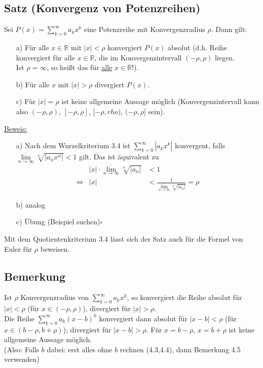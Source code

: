 \documentclass[12pt, titlepage]{article}
\newcommand{\R}{\mathds{R}}
\newcommand{\infn}{n\rightarrow\infty}
\renewcommand{\>}{\rightarrow}
\renewcommand{\*}{\cdot}
\renewcommand{\limsup}[1]{\underset{#1}{\overline{\lim}}}
\begin{document}
	\subsection{Satz (Konvergenz von Potenzreihen)}
	Sei $P(x)=\sum_{k=0}^{\infty}a_kx^k$ eine Potenzreihe mit Konvergenzradius $\rho$. Dann gilt:
	\begin{itemize}
		\item[a)] Für alle $x\in\R$ mit $|x|<\rho$ konvergiert $P(x)$ absolut (d.h. Reihe konvergiert für alle $x\in\R$, die im Konvergenzintervall $(-\rho,\rho)$ liegen.\\
		Ist $\rho=\infty$, so heißt das für \underline{alle} $x\in\R$!).
		\item[b)] Für alle $x$ mit $|x|>\rho$ divergiert $P(x)$.
		\item[c)] Für $|x|=\rho$ ist keine allgemeine Aussage möglich (Konvergenzintervall kann also $(-\rho,\rho)$, $[-\rho,\rho]$, $[-\rho,rho)$, $(-\rho,\rho]$ sein).
	\end{itemize}
	\underline{Beweis:}
	\begin{itemize}
		\item[a)] Nach dem Wurzelkriterium 3.4  ist $\sum_{k=0}^{\infty}|a_kx^k|$ konvergent, falls $\limsup{\infn}\sqrt[n]{|a_nx^n|}<1$ gilt. Das ist äquivalent zu
		\begin{align*}
			&|x|\*\limsup{\infn}\sqrt[n]{|a_n|}&<1\\
			\Leftrightarrow&|x|&<\frac{1}{\limsup{\infn}\sqrt[n]{|a_n|}}=\rho
		\end{align*}
		\item[b)] analog
		\item[c)] Übung (Beispiel suchen)\hfill$\square$
	\end{itemize}
	Mit dem Quotientenkriterium 3.4  lässt sich der Satz auch für die Formel von Euler für $\rho$ beweisen.	
	\subsection{Bemerkung}
	Ist $\rho$ Konvergenzradius von $\sum_{k=0}^{\infty}a_kx^k$, so konvergiert die Reihe absolut für $|x|<\rho$ (für $x\in(-\rho,\rho)$), divergiert für $|x|>\rho$.\\
	Die Reihe $\sum_{k=0}^{\infty}a_k(x-b)^k$ konvergiert dann absolut für $|x-b|<\rho$ (für $x\in(b-\rho,b+\rho)$); divergiert für $|x-b|>\rho$. Für $x=b-\rho$, $x=b+\rho$ ist keine allgemeine Aussage möglich.\\
	(Also: Falls $b$ dabei: erst alles ohne $b$ rechnen (4.3,4.4), dann Bemerkung 4.5 verwenden)
\end{document}
